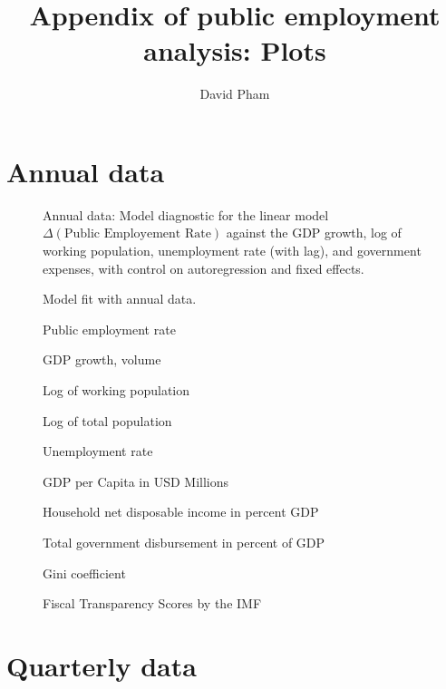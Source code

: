 \documentclass[a4paper, 10pt]{article}
\title{Appendix of public employment analysis: Plots}
\author{David Pham}
\newcommand{\insertplot}[2]{
  \begin{figure}[!ht]
    \centering
    
    \caption{#2}
  \end{figure}
}
\begin{document}
\maketitle
\listoffigures
\section{Annual data}

\begin{landscape}

  \insertplot{model_diagnostic.tex}{Annual data: Model diagnostic for the linear model
    $\Delta( \textrm{Public Employement Rate})$ against the GDP growth, log of
    working population, unemployment rate (with lag), and government expenses,
    with control on autoregression and fixed effects.}

  \insertplot{model_fit_quality.tex}{Model fit with annual data.}
  \insertplot{simple_model_egr.tex}{Public employment rate}
  \insertplot{simple_model_gdpv_annpct.tex}{GDP growth, volume}
  \insertplot{simple_model_lpop.tex}{Log of working population}
  \insertplot{simple_model_lpoptot.tex}{Log of total population}
  \insertplot{simple_model_unr.tex}{Unemployment rate}
  \insertplot{simple_model_gdp_per_capita.tex}{GDP per Capita in USD Millions}
  \insertplot{simple_model_ydrh_to_gdpv.tex}{Household net disposable income in percent
    GDP}
  \insertplot{simple_model_ypgtq.tex}{Total government disbursement in
    percent of GDP}
  \insertplot{simple_model_incomeineq.tex}{Gini coefficient}
  \insertplot{simple_model_fiscal_transparency.tex}{Fiscal Transparency Scores
    by the IMF}
\end{landscape}

\section{Quarterly data}
\end{document}
